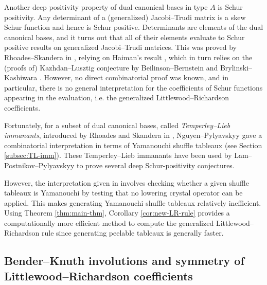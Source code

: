 \documentclass[ALCO,Unicode]{cedram}
\begin{document}
    Another deep positivity property of dual canonical bases in type $A$ is Schur positivity. Any determinant of a (generalized) Jacobi--Trudi matrix is a skew Schur function and hence is Schur positive. Determinants are elements of the dual canonical bases, and it turns out that all of their elements evaluate to Schur positive results on generalized Jacobi--Trudi matrices. This was proved by Rhoades--Skandera in \cite[Proposition 3]{rhoades2006kazhdan}, relying on Haiman's result \cite[Theorem 1.5]{haiman1993hecke}, which in turn relies on the (proofs of) Kazhdan--Lusztig conjecture by Beilinson--Bernstein \cite{BB} and Brylinski--Kashiwara \cite{brylinski1981kazhdan}. However, no direct combinatorial proof was known, and in particular, there is no general interpretation for the coefficients of Schur functions appearing in the evaluation, i.e. the generalized Littlewood--Richardson coefficients.

    Fortunately, for a subset of dual canonical bases, called \textit{Temperley--Lieb immanants}, introduced by Rhoades and Skandera in \cite{rhoades2005temperley}, Nguyen--Pylyavskyy \cite{nguyen2025temperley} gave a combinatorial interpretation in terms of Yamanouchi shuffle tableaux (see Section \ref{subsec:TL-imm}). These Temperley--Lieb immanants have been used by Lam--Postnikov--Pylyavskyy \cite{lam2007schur} to prove several deep Schur-positivity conjectures.

    However, the interpretation given in \cite{nguyen2025temperley} involves checking whether a given shuffle tableaux is Yamanouchi by testing that no lowering crystal operator can be applied. This makes generating Yamanouchi shuffle tableaux relatively inefficient. Using Theorem \ref{thm:main-thm}, Corollary \ref{cor:new-LR-rule} provides a computationally more efficient method to compute the generalized Littlewood--Richardson rule since generating peelable tableaux is generally faster.

\subsection{Bender--Knuth involutions and symmetry of Littlewood--Richardson coefficients}
\end{document}

